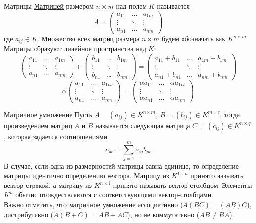 \documentclass[10pt, handout]{beamer}
\begin{document}
\begin{frame}{Матрицы}
\underline{Матрицей} размером $n\times m$ над полем $K$ называется 
$$
A=\left(
\begin{array}{ccc}
a_{11} & \ldots & a_{1m} \\
\vdots & \ddots & \vdots \\
a_{n1} & \ldots & a_{nm}
\end{array}
\right)
$$
где $a_{ij}\in K$. Множество всех матриц размера $n\times m$ будем обозначать как $K^{n\times m}$ \\
\vspace{1em}
\pause
Матрицы образуют линейное пространства над $K$:
$$
\left(
\begin{array}{ccc}
a_{11} & \ldots & a_{1m} \\
\vdots & \ddots & \vdots \\
a_{n1} & \ldots & a_{nm}
\end{array}
\right)
+
\left(
\begin{array}{ccc}
b_{11} & \ldots & b_{1m} \\
\vdots & \ddots & \vdots \\
b_{n1} & \ldots & b_{nm}
\end{array}
\right)
=
\left(
\begin{array}{ccc}
a_{11}+b_{11} & \ldots & a_{1m}+b_{1m} \\
\vdots & \ddots & \vdots \\
a_{n1}+b_{n1} & \ldots & a_{nm}+b_{nm}
\end{array}
\right)
$$
$$
\alpha \left(
\begin{array}{ccc}
a_{11} & \ldots & a_{1m} \\
\vdots & \ddots & \vdots \\
a_{n1} & \ldots & a_{nm}
\end{array}
\right)
=
\left(
\begin{array}{ccc}
\alpha a_{11} & \ldots & \alpha a_{1m} \\
\vdots & \ddots & \vdots \\
\alpha a_{n1} & \ldots & \alpha a_{nm}
\end{array}
\right)
$$
\end{frame}


\begin{frame}{Матричное умножение}
Пусть $A=(a_{ij})\in K^{n\times m}$, $B=(b_{ij})\in K^{m\times q}$, тогда произведением матриц $A$ и $B$ называется следующая матрица $C=(c_{ij})\in K^{n\times q}$, которая задается соотношениями
$$
c_{ik}=\sum_{j=1}^ma_{ij}b_{jk}
$$
\pause
В случае, если одна из размерностей матрицы равна единице, то определение матрицы идентично определению вектора. Матрицу из $K^{1\times n}$ принято называть вектор-строкой, а матрицу из $K^{n\times 1}$ принято называть вектор-столбцом. Элементы $K^n$ обычно отождествляются с соответствующими вектор-столбцами.\\
\pause
\vspace{1em}
Важно отметить, что матричное умножение ассоциативно ($A(BC)=(AB)C$), дистрибутивно ($A(B+C)=AB+AC$), но не коммутативно ($AB\neq BA$). 
\end{frame}
\end{document}

